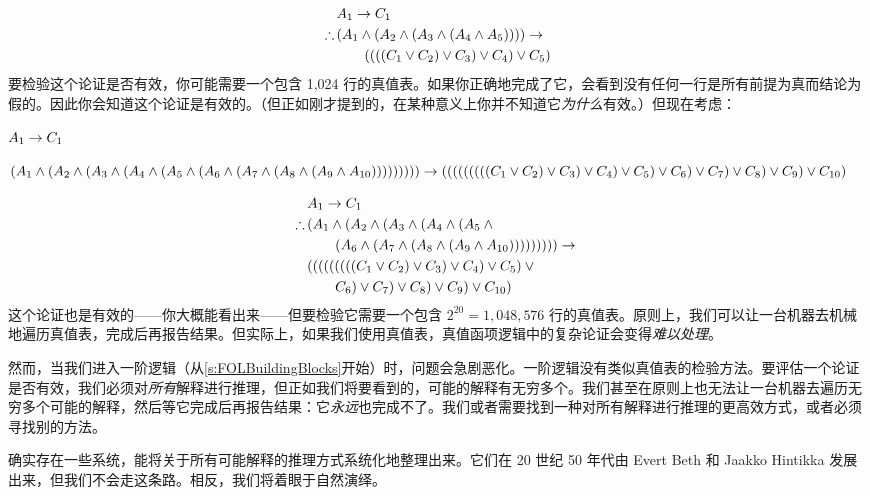 \else
\begin{align*}
	& A_1 \eif C_1 \\
	\therefore\, & (A_1 \eand (A_2 \eand (A_3 \eand (A_4 \eand A_5)))) \eif {}\\
	& \qquad ((((C_1 \eor C_2) \eor C_3) \eor C_4) \eor C_5)
\end{align*}
\fi
要检验这个论证是否有效，你可能需要一个包含 1{,}024 行的真值表。如果你正确地完成了它，会看到没有任何一行是所有前提为真而结论为假的。因此你会知道这个论证是有效的。（但正如刚才提到的，在某种意义上你并不知道它\emph{为什么}有效。）但现在考虑：
\ifHTMLtarget


\begin{earg}
\item $A_1 \rightarrow C_1$
\item[\texttherefore] $(A_1 \wedge (A_2 \wedge (A_3 \wedge (A_4 \wedge (A_5 \wedge
 (A_6 \wedge (A_7 \wedge (A_8 \wedge (A_9 \wedge A_{10}))))))))) \rightarrow
 (((((((((C_1 \vee C_2) \vee C_3) \vee C_4) \vee C_5) \vee  C_6) \vee
 C_7) \vee C_8) \vee C_9) \vee C_{10})$
\end{earg}


\else
\begin{align*}
& A_1 \eif C_1 \\
\therefore\, & \small (A_1 \eand (A_2 \eand (A_3 \eand (A_4 \eand (A_5 \eand {}\\
&\qquad (A_6 \eand (A_7 \eand (A_8 \eand (A_9 \eand A_{10}))))))))) \eif {}\\
&(((((((((C_1 \eor C_2) \eor C_3) \eor C_4) \eor C_5) \eor {}\\
& \qquad C_6) \eor C_7) \eor C_8) \eor C_9) \eor C_{10})
\end{align*}
\fi
这个论证也是有效的——你大概能看出来——但要检验它需要一个包含 $2^{20} = 1{,}048{,}576$ 行的真值表。原则上，我们可以让一台机器去机械地遍历真值表，完成后再报告结果。但实际上，如果我们使用真值表，真值函项逻辑中的复杂论证会变得\emph{难以处理}。

然而，当我们进入一阶逻辑（从\cref{s:FOLBuildingBlocks}开始）时，问题会急剧恶化。一阶逻辑没有类似真值表的检验方法。要评估一个论证是否有效，我们必须对\emph{所有}解释进行推理，但正如我们将要看到的，可能的解释有无穷多个。我们甚至在原则上也无法让一台机器去遍历无穷多个可能的解释，然后等它完成后再报告结果：它\emph{永远}也完成不了。我们或者需要找到一种对所有解释进行推理的更高效方式，或者必须寻找别的方法。

确实存在一些系统，能将关于所有可能解释的推理方式系统化地整理出来。它们在 20 世纪 50 年代由 Evert Beth 和 Jaakko Hintikka 发展出来，但我们不会走这条路。相反，我们将着眼于自然演绎。

